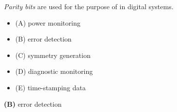 

{\it Parity bits} are used for the purpose of \underbar{\hskip 50pt} in digital systems.

\begin{itemize}
\item{(A)} power monitoring
\vskip 5pt 
\item{(B)} error detection
\vskip 5pt 
\item{(C)} symmetry generation
\vskip 5pt 
\item{(D)} diagnostic monitoring
\vskip 5pt 
\item{(E)} time-stamping data
\end{itemize}







{\bf (B)} error detection
 










